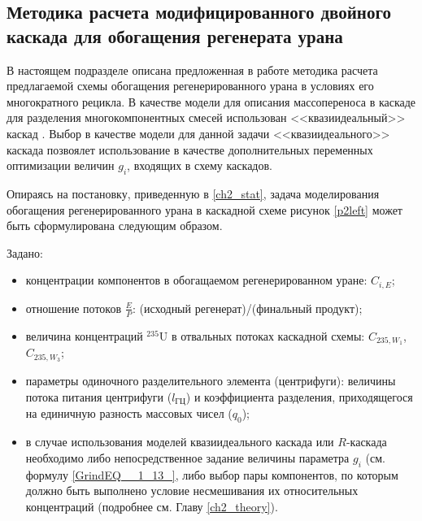 
\subsection{Методика расчета модифицированного двойного каскада для обогащения регенерата урана}\label{statement}

В настоящем подразделе описана предложенная в работе методика расчета предлагаемой схемы обогащения регенерированного урана в условиях его многократного рецикла. В качестве модели для описания массопереноса в каскаде для разделения многокомпонентных смесей использован <<квазиидеальный>> каскад \cite{sazykinKvaziidealnyeKaskadyDlya2000}. Выбор в качестве модели для данной задачи <<квазиидеального>> каскада позвоялет использование в качестве дополнительных переменных оптимизации величин $g_{i}$, входящих в схему каскадов. 


Опираясь на постановку, приведенную в \ref{ch2_stat}, задача моделирования обогащения регенерированного урана в каскадной схеме рисунок \ref{p2left} может быть сформулирована следующим образом.

Задано:

\begin{itemize}
    \item концентрации компонентов в обогащаемом регенерированном уране: $C_{i,{E}}$; 
    \item отношение потоков $\frac{E}{P}$: (исходный регенерат)/(финальный продукт);
    \item величина концентраций $^{235}$U в отвальных потоках каскадной схемы: $C_{235,{W_1}}$, $C_{235,{W_3}}$;
    \item параметры одиночного разделительного элемента (центрифуги): величины потока питания центрифуги ($l_\textit{ГЦ}$) и коэффициента разделения, приходящегося на единичную разность массовых чисел ($q_{0}$);
    \item в случае использования моделей квазиидеального каскада или $R$-каскада необходимо либо непосредственное задание величины параметра $g_i$ (см. формулу \ref{GrindEQ__1_13_}, либо выбор пары компонентов, по которым должно быть выполнено условие несмешивания их относительных концентраций (подробнее см. Главу \ref{ch2_theory}).
\end{itemize}

